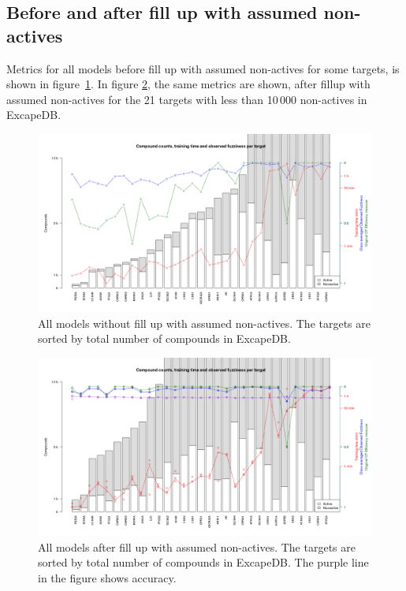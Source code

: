 \documentclass[10pt,article]{memoir}
\begin{document}
\subsection{Before and after fill up with assumed non-actives}

Metrics for all models before fill up with assumed non-actives for some
targets, is shown in figure~\ref{fig:allmodels_nofillup}. In figure
\ref{fig:allmodels_fillup}, the same metrics are shown, after fillup with
assumed non-actives for the 21 targets with less than 10\,000 non-actives in
ExcapeDB.

\begin{figure}[h!]
\includegraphics[width=\textwidth]{figures/final_models_20171106_nofillup.png}
    \caption{All models without fill up with assumed non-actives. The targets are sorted by total number of compounds in ExcapeDB.}
    \label{fig:allmodels_nofillup}
\end{figure}

\begin{figure}[h!]
\includegraphics[width=\textwidth]{figures/final_models_20180223_fillup.png}
    \caption{All models after fill up with assumed non-actives. The targets are sorted by total number of compounds in ExcapeDB. The purple line in the figure shows accuracy.}
    \label{fig:allmodels_fillup}
\end{figure}
\end{document}
